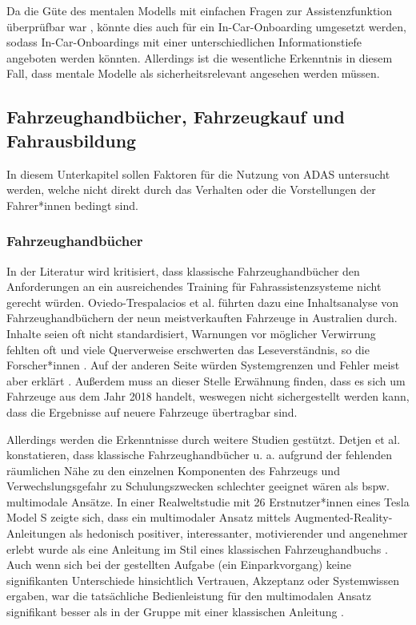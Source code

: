 Da die Güte des mentalen Modells mit einfachen Fragen zur Assistenzfunktion überprüfbar war \cite{gaspar2020impact}, könnte dies auch für ein In-Car-Onboarding umgesetzt werden, sodass In-Car-Onboardings mit einer unterschiedlichen Informationstiefe angeboten werden könnten. Allerdings ist die wesentliche Erkenntnis in diesem Fall, dass mentale Modelle als sicherheitsrelevant angesehen werden müssen.

\subsection{Fahrzeughandbücher, Fahrzeugkauf und Fahrausbildung}
\label{subsec:informationsquellen}
In diesem Unterkapitel sollen Faktoren für die Nutzung von ADAS untersucht werden, welche nicht direkt durch das Verhalten oder die Vorstellungen der Fahrer*innen bedingt sind.

\subsubsection{Fahrzeughandbücher}
\label{subsubsec:fahrzeughandbücher}
In der Literatur \cite{oviedo2021flick} wird kritisiert, dass klassische Fahrzeughandbücher den Anforderungen an ein ausreichendes Training für Fahrassistenzsysteme nicht gerecht würden. Oviedo-Trespalacios et al. \cite{oviedo2021flick} führten dazu eine Inhaltsanalyse von Fahrzeughandbüchern der neun meistverkauften Fahrzeuge in Australien durch. Inhalte seien oft nicht standardisiert, Warnungen vor möglicher Verwirrung fehlten oft und viele Querverweise erschwerten das Leseverständnis, so die Forscher*innen \cite{oviedo2021flick}. Auf der anderen Seite würden Systemgrenzen und Fehler meist aber erklärt \cite{oviedo2021flick}. Außerdem muss an dieser Stelle Erwähnung finden, dass es sich um Fahrzeuge aus dem Jahr 2018 handelt, weswegen nicht sichergestellt werden kann, dass die Ergebnisse auf neuere Fahrzeuge übertragbar sind.

Allerdings werden die Erkenntnisse durch weitere Studien \cite{detjen2021supporting, casner2019we} gestützt. Detjen et al. \cite{detjen2021supporting} konstatieren, dass klassische Fahrzeughandbücher u. a. aufgrund der fehlenden räumlichen Nähe zu den einzelnen Komponenten des Fahrzeugs und Verwechslungsgefahr zu Schulungszwecken schlechter geeignet wären als bspw. multimodale Ansätze. In einer Realweltstudie mit 26 Erstnutzer*innen eines Tesla Model S zeigte sich, dass ein multimodaler Ansatz mittels Augmented-Reality-Anleitungen als hedonisch positiver, interessanter, motivierender und angenehmer erlebt wurde als eine Anleitung im Stil eines klassischen Fahrzeughandbuchs \cite{detjen2021supporting}. Auch wenn sich bei der gestellten Aufgabe (ein Einparkvorgang) keine signifikanten Unterschiede hinsichtlich Vertrauen, Akzeptanz oder Systemwissen ergaben, war die tatsächliche Bedienleistung für den multimodalen Ansatz signifikant besser als in der Gruppe mit einer klassischen Anleitung \cite{detjen2021supporting}. 

